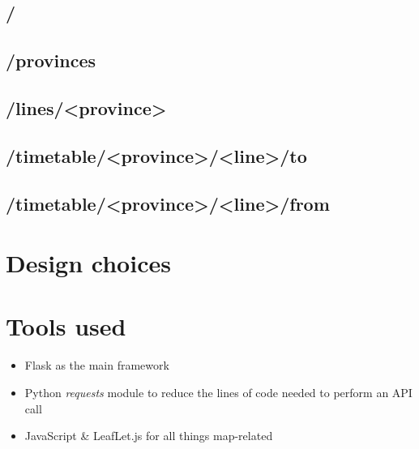 \documentclass[12pt]{article}
\begin{document}
\subsection{/}

\subsection{/provinces}

\subsection{/lines/<province>}

\subsection{/timetable/<province>/<line>/to}

\subsection{/timetable/<province>/<line>/from}

\newpage

\section{Design choices}


\newpage

\section{Tools used}
\begin{itemize}
	\item Flask as the main framework
	\item Python \emph{requests} module to reduce the lines of code needed to perform an API call
	\item JavaScript \& LeafLet.js for all things map-related

\end{itemize}
\end{document}
